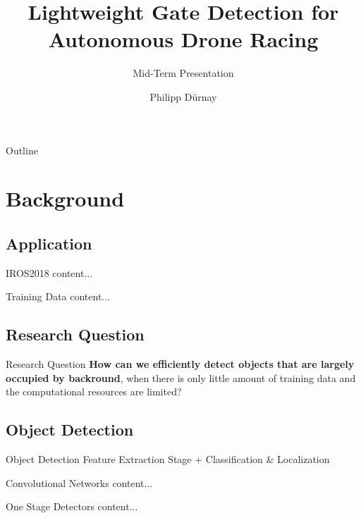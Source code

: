 \documentclass{beamer}
\title{Lightweight Gate Detection for Autonomous Drone Racing} %
\subtitle{Mid-Term Presentation} %
\author{Philipp Dürnay}
\begin{document}
  \frame{\maketitle}


  \begin{darkframes}
  	\begin{frame}{Outline}
  		\tableofcontents
  	\end{frame}
    \section{Background}
    \subsection{Application}
    \begin{frame}{IROS2018}
    	content...
    \end{frame}
    \begin{frame}{Training Data}
       	content...
    \end{frame}
	\subsection{Research Question}    
	\begin{frame}{Research Question}
	\textbf{How can we efficiently detect objects that are largely occupied by backround}, when there is only little amount of training data and the computational resources are limited?
	\end{frame}
    \subsection{Object Detection}
    \begin{frame}{Object Detection}
    	Feature Extraction Stage + Classification \& Localization
    \end{frame}
    \begin{frame}{Convolutional Networks}
    	content...
    \end{frame}
    \begin{frame}{One Stage Detectors}
       	content...
    \end{frame}


\end{darkframes}
\end{document}
